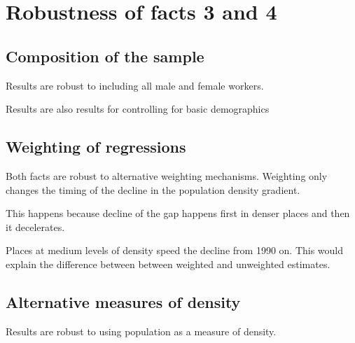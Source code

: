 \section{Robustness of facts 3 and 4}
\subsection{Composition of the sample}
\bitem
\item Results are robust to including all male and female workers.
\item Results are also results for controlling for basic demographics
\eitem
\subsection{Weighting of regressions}
Both facts are robust to alternative weighting mechanisms. Weighting only changes the timing of the decline in the population density gradient. 
\bitem
	\item This happens because decline of the gap happens first in denser places and then it decelerates. 
	\item Places at medium levels of density speed the decline from 1990 on. This would explain the difference between between weighted and unweighted estimates.
\eitem	

\subsection{Alternative measures of density}
\bitem
\item Results are robust to using population as a measure of density.
\eitem